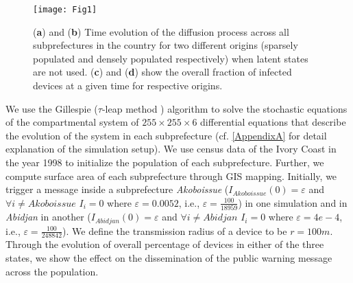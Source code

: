 \documentclass[review]{elsarticle}
\begin{document}
\begin{figure}
    \centering
    \texttt{[image: Fig1]}
    \caption{(\textbf{a}) and (\textbf{b}) Time evolution of the diffusion process across all subprefectures in the country for two different origins (sparsely populated and densely populated respectively) when latent states are not used. (\textbf{c}) and (\textbf{d}) show the overall fraction of infected devices at a given time for respective origins.}
    \label{fig:sirgillespi}
\end{figure}


We use the Gillespie ($\tau$-leap method \cite{Gillespie2001, Gillespie2006}) algorithm to solve the stochastic equations of the compartmental system of $255 \times 255 \times 6$ differential equations that describe the evolution of the system in each subprefecture (cf. \ref{AppendixA} for detail explanation of the simulation setup). We use census data of the Ivory Coast in the year 1998 \cite{Web1} to initialize the population of each subprefecture. Further, we compute surface area of each subprefecture through GIS mapping. Initially, we trigger a message inside a subprefecture \emph{Akoboissue} ($I_{Akoboissue}(0)=\varepsilon$ and $\forall i \neq Akoboissue$ $I_i=0$ where $\varepsilon=0.0052$, i.e., $\varepsilon=\frac{100}{18959}$) in one simulation and in \emph{Abidjan} in another ($I_{Abidjan}(0)=\varepsilon$ and $\forall i \neq Abidjan$ $I_i=0$ where $\varepsilon=4e-4$, i.e., $\varepsilon=\frac{100}{248842}$). We define the transmission radius of a device to be  $r=100m$. Through the evolution of overall percentage of devices in either of the three states, we show the effect on the dissemination of the public warning message across the population.
\end{document}
